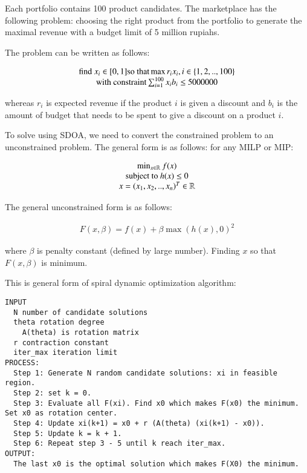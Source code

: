 \documentclass[preprint, 3p,
authoryear]{elsarticle} %
\begin{document}
Each portfolio contains 100 product candidates. The marketplace has the
following problem: choosing the right product from the portfolio to
generate the maximal revenue with a budget limit of 5 million rupiahs.

The problem can be written as follows:

\begin{align}
\begin{matrix} 
\text{find }x_i \in [0,1] \space \text{so that} \space \max{r_i x_i}, \space i \in \{1,2,..,100\} \\
\text{with constraint} \space \sum_{i = 1}^{100}x_i b_i \leq 5000000
\end{matrix} 
\end{align}

whereas \(r_i\) is expected revenue if the product \(i\) is given a
discount and \(b_i\) is the amount of budget that needs to be spent to
give a discount on a product \(i\).

To solve using SDOA, we need to convert the constrained problem to an
unconstrained problem. The general form is as follows: for any MILP or
MIP:

\begin{align}
\begin{matrix} 
\min_{x \in \mathbb{R}} f(x) \\
\text{subject to } \space h(x) \leq 0 \\
x = (x_1,x_2,..,x_n)^T \in \mathbb{R}
\end{matrix}
\end{align}

The general unconstrained form is as follows:

\begin{align}
F(x,\beta) = f(x) + \beta \max(h(x),0)^2
\end{align}

where \(\beta\) is penalty constant (defined by large number). Finding
\(x\) so that \(F(x,\beta)\) is minimum.

This is general form of spiral dynamic optimization algorithm:

\begin{verbatim}
INPUT
  N number of candidate solutions
  theta rotation degree
    A(theta) is rotation matrix
  r contraction constant
  iter_max iteration limit
PROCESS:
  Step 1: Generate N random candidate solutions: xi in feasible region. 
  Step 2: set k = 0.
  Step 3: Evaluate all F(xi). Find x0 which makes F(x0) the minimum. Set x0 as rotation center.
  Step 4: Update xi(k+1) = x0 + r (A(theta) (xi(k+1) - x0)).
  Step 5: Update k = k + 1.
  Step 6: Repeat step 3 - 5 until k reach iter_max.
OUTPUT:
  The last x0 is the optimal solution which makes F(X0) the minimum.
\end{verbatim}
\end{document}

